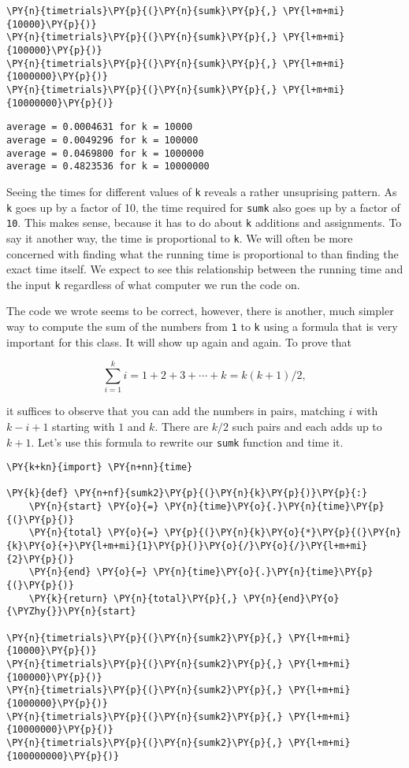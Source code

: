 \begin{Verbatim}[commandchars=\\\{\}]
\PY{n}{timetrials}\PY{p}{(}\PY{n}{sumk}\PY{p}{,} \PY{l+m+mi}{10000}\PY{p}{)}
\PY{n}{timetrials}\PY{p}{(}\PY{n}{sumk}\PY{p}{,} \PY{l+m+mi}{100000}\PY{p}{)}
\PY{n}{timetrials}\PY{p}{(}\PY{n}{sumk}\PY{p}{,} \PY{l+m+mi}{1000000}\PY{p}{)}
\PY{n}{timetrials}\PY{p}{(}\PY{n}{sumk}\PY{p}{,} \PY{l+m+mi}{10000000}\PY{p}{)}
\end{Verbatim}

\begin{Verbatim}
average = 0.0004631 for k = 10000
average = 0.0049296 for k = 100000
average = 0.0469800 for k = 1000000
average = 0.4823536 for k = 10000000

\end{Verbatim}


Seeing the times for different values of \texttt{k} reveals a rather unsuprising pattern.
As \texttt{k} goes up by a factor of 10, the time required for \texttt{sumk} also goes up by a factor of \texttt{10}.
This makes sense, because it has to do about \texttt{k} additions and assignments.
To say it another way, the time is proportional to \texttt{k}.
We will often be more concerned with finding what the running time is proportional to than finding the exact time itself.
We expect to see this relationship between the running time and the input \texttt{k} regardless of what computer we run the code on.


The code we wrote seems to be correct, however, there is another, much simpler way to compute the sum of the numbers from \texttt{1} to \texttt{k} using a formula that is very important for this class.
It will show up again and again.
To prove that


\[
\sum_{i = 1}^k i = 1 + 2 + 3 + \cdots + k = k (k + 1) / 2,
\]


it suffices to observe that you can add the numbers in pairs, matching $i$ with $k-i + 1$ starting with $1$ and $k$.
There are $k/2$ such pairs and each adds up to $k+1$.
Let's use this formula to rewrite our \texttt{sumk} function and time it.


\begin{Verbatim}[commandchars=\\\{\}]
\PY{k+kn}{import} \PY{n+nn}{time}

\PY{k}{def} \PY{n+nf}{sumk2}\PY{p}{(}\PY{n}{k}\PY{p}{)}\PY{p}{:}
    \PY{n}{start} \PY{o}{=} \PY{n}{time}\PY{o}{.}\PY{n}{time}\PY{p}{(}\PY{p}{)}
    \PY{n}{total} \PY{o}{=} \PY{p}{(}\PY{n}{k}\PY{o}{*}\PY{p}{(}\PY{n}{k}\PY{o}{+}\PY{l+m+mi}{1}\PY{p}{)}\PY{o}{/}\PY{o}{/}\PY{l+m+mi}{2}\PY{p}{)}
    \PY{n}{end} \PY{o}{=} \PY{n}{time}\PY{o}{.}\PY{n}{time}\PY{p}{(}\PY{p}{)}
    \PY{k}{return} \PY{n}{total}\PY{p}{,} \PY{n}{end}\PY{o}{\PYZhy{}}\PY{n}{start}

\PY{n}{timetrials}\PY{p}{(}\PY{n}{sumk2}\PY{p}{,} \PY{l+m+mi}{10000}\PY{p}{)}
\PY{n}{timetrials}\PY{p}{(}\PY{n}{sumk2}\PY{p}{,} \PY{l+m+mi}{100000}\PY{p}{)}
\PY{n}{timetrials}\PY{p}{(}\PY{n}{sumk2}\PY{p}{,} \PY{l+m+mi}{1000000}\PY{p}{)}
\PY{n}{timetrials}\PY{p}{(}\PY{n}{sumk2}\PY{p}{,} \PY{l+m+mi}{10000000}\PY{p}{)}
\PY{n}{timetrials}\PY{p}{(}\PY{n}{sumk2}\PY{p}{,} \PY{l+m+mi}{100000000}\PY{p}{)}
\end{Verbatim}

